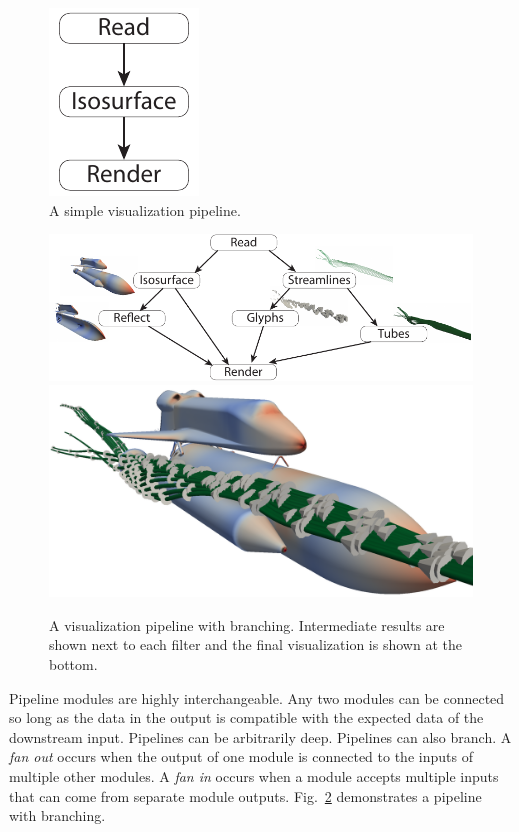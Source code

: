 \documentclass[journal,twocolumn,10pt,letterpaper,twoside]{IEEEtran}
\newcommand*{\figref}[1]{Fig.~\ref{#1}}
\newcommand*{\keyterm}[1]{\emph{#1}}
\begin{document}
\begin{figure}[htbp]
  \centering
  \includegraphics{images/SimplePipeline}
  \caption{A simple visualization pipeline.}
  \label{fig:SimplePipeline}
\end{figure}

\begin{figure}[htbp]
  \centering
  \includegraphics[width=5.5in]{images/BranchingPipeline2} \\
  \includegraphics[width=5in]{images/BranchingPipeline2Result}
  \caption{A visualization pipeline with branching.  Intermediate results
    are shown next to each filter and the final visualization is shown at
    the bottom.}
  \label{fig:BranchingPipeline}
\end{figure}

Pipeline modules are highly interchangeable.  Any two modules can be
connected so long as the data in the output is compatible with the expected
data of the downstream input.  Pipelines can be arbitrarily deep.
Pipelines can also branch.  A \keyterm{fan out} occurs when the output of
one module is connected to the inputs of multiple other modules.  A
\keyterm{fan in} occurs when a module accepts multiple inputs that can
come from separate module outputs.  \figref{fig:BranchingPipeline}
demonstrates a pipeline with branching.
\end{document}
